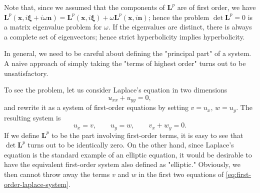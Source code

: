 Note that, since we assumed that the components of $\bm{L}^p$ are of first order, we have $\bm{L}^p(\bm{x},i\bm{\xi}+i\omega\bm{n})=\bm{L}^p(\bm{x},i\bm{\xi})+\omega\bm{L}^p(\bm{x},i\bm{n})$; hence the problem $\det\bm{L}^p=0$ is a matrix eigenvalue problem for $\omega$. If the eigenvalues are distinct, there is always a complete set of eigenvectors; hence strict hyperbolicity implies hyperbolicity.

In general, we need to be careful about defining the "principal part" of a system. A naive approach of simply taking the "terms of highest order" turns out to be unsatisfactory.

\begin{Example}
\label{ex:weighted-laplace-reformulation}
To see the problem, let us consider Laplace's equation in two dimensions
\begin{equation}\label{eq:first-order-laplace-reformulation-origin}
u_{xx}+u_{yy}=0,
\end{equation}
and rewrite it as a system of first-order equations by setting $v=u_x$, $w=u_y$. The resulting system is
\begin{equation}\label{eq:first-order-laplace-system}
u_x=v,\qquad u_y=w,\qquad v_x+w_y=0.
\end{equation}
If we define $\bm{L}^p$ to be the part involving first-order terms, it is easy to see that $\det\bm{L}^p$ turns out to be identically zero. On the other hand, since Laplace's equation is the standard example of an elliptic equation, it would be desirable to have the equivalent first-order system also defined as "elliptic." Obviously, we then cannot throw away the terms $v$ and $w$ in the first two equations of \eqref{eq:first-order-laplace-system}.
\end{Example}

